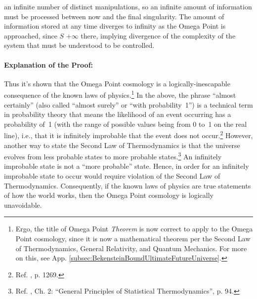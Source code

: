 \documentclass[letterpaper,12pt]{article}
\newenvironment{squote}
  {\small\quote}
  {\endquote\normalsize}
\begin{document}
\begin{squote}
an infinite number of distinct manipulations, so an infinite amount of information must be processed between now and the final singularity. The amount of information stored at any time diverges to infinity as the Omega Point is approached, since \( S \)  \( +\infty \) there, implying divergence of the complexity of the system that must be understood to be controlled.
\end{squote}

\paragraph{Explanation of the Proof:}
\label{parag:ExplanationofProof}

Thus it's shown that the Omega Point cosmology is a logically-inescapable consequence of the known laws of physics.\footnote{Ergo, the title of Omega Point \emph{Theorem} is now correct to apply to the Omega Point cosmology, since it is now a mathematical theorem per the Second Law of Thermodynamics, General Relativity, and Quantum Mechanics. For more on this, see App. \ref{subsec:BekensteinBoundUltimateFutureUniverse}.} In the above, the phrase ``almost certainly'' (also called ``almost surely'' or ``with probability~1'') is a technical term in probability theory that means the likelihood of an event occurring has a probability of~1 (with the range of possible values being from 0 to~1 on the real line), i.e., that it is infinitely improbable that the event does not occur.\footnote{Ref. , p. 1269.} However, another way to state the Second Law of Thermodynamics is that the universe evolves from less probable states to more probable states.\footnote{Ref. , Ch. 2: ``General Principles of Statistical Thermodynamics'', p. 94.} An infinitely improbable state is not a ``more probable'' state. Hence, in order for an infinitely improbable state to occur would require violation of the Second Law of Thermodynamics. Consequently, if the known laws of physics are true statements of how the world works, then the Omega Point cosmology is logically unavoidable.
\end{document}
